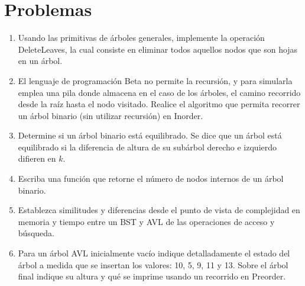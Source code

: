 \section{Problemas}
\begin{enumerate}
\item Usando las primitivas de árboles generales, implemente la operación DeleteLeaves, la cual consiste en eliminar todos aquellos nodos que son hojas en un árbol.
\item El lenguaje de programación Beta no permite la recursión, y para simularla emplea una pila donde almacena en el caso de los árboles, el camino recorrido desde la raíz hasta el nodo visitado. Realice el algoritmo que permita recorrer un árbol binario (sin utilizar recursión) en Inorder.
\item Determine si un árbol binario está equilibrado. Se dice que un árbol está equilibrado si la diferencia de altura de su subárbol derecho e izquierdo difieren en $k$.
\item Escriba una función que retorne el número de nodos internos de un árbol binario.
\item Establezca similitudes y diferencias desde el punto de vista de complejidad en memoria y tiempo entre un BST y AVL de las operaciones de acceso y búsqueda.
\item Para un árbol AVL inicialmente vacío indique detalladamente el estado del árbol a medida que se insertan los valores: 10, 5, 9, 11 y 13. Sobre el árbol final indique su altura y qué se imprime usando un recorrido en Preorder.
\end{enumerate}
